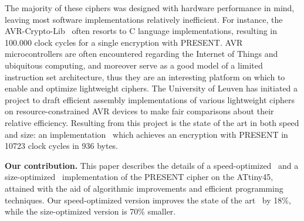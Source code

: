 \documentclass[11pt]{llncs2e} %
\begin{document}
The majority of these ciphers was designed with hardware performance in mind, leaving most software implementations relatively inefficient. For instance, the AVR-Crypto-Lib~\cite{avr_crypto_lib} often resorts to C language implementations, resulting in 100.000 clock cycles for a single encryption with PRESENT.
AVR microcontrollers are often encountered regarding the Internet of Things and ubiquitous computing, and moreover serve as a good model of a limited instruction set architecture, thus they are an interesting platform on which to enable and optimize lightweight ciphers.
The University of Leuven has initiated a project to draft efficient assembly implementations of various lightweight ciphers on resource-constrained AVR devices to make fair comparisons about their relative efficiency.
Resulting from this project is the state of the art in both speed and size: an implementation~\cite{eisenbarth2012compact} which achieves an encryption with PRESENT in 10723 clock cycles in 936 bytes.

\textbf{Our contribution.} This paper describes the details of a speed-optimized~\cite{kostas_code} and a size-optimized~\cite{aram_code} implementation of the PRESENT cipher on the ATtiny45, attained with the aid of algorithmic improvements and efficient programming techniques.
Our speed-optimized version improves the state of the art~\cite{eisenbarth2012compact} by 18\%, while the size-optimized version is 70\% smaller.
\end{document}
